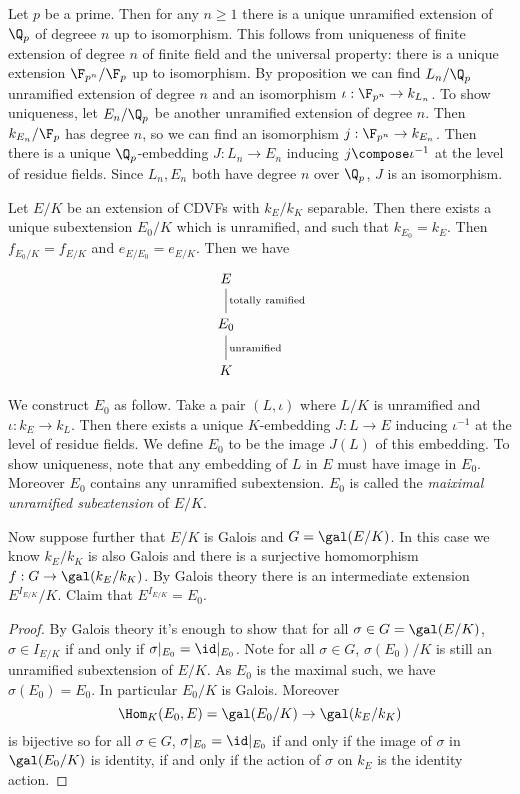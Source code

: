 \documentclass[a4paper]{article}
\begin{document}
\begin{eg}
  Let \(p\) be a prime. Then for any \(n \geq 1\) there is a unique unramified extension of \(\Q_p\) of degreee \(n\) up to isomorphism. This follows from uniqueness of finite extension of degree \(n\) of finite field and the universal property: there is a unique extension \(\F_{p^n}/\F_p\) up to isomorphism. By proposition we can find \(L_n/\Q_p\) unramified extension of degree \(n\) and an isomorphism \(\iota: \F_{p^n} \to k_{L_n}\). To show uniqueness, let \(E_n/\Q_p\) be another unramified extension of degree \(n\). Then \(k_{E_n}/\F_p\) has degree \(n\), so we can find an isomorphism \(j: \F_{p^n} \to k_{E_n}\). Then there is a unique \(\Q_p\)-embedding \(J: L_n \to E_n\) inducing \(j \compose \iota^{-1}\) at the level of residue fields. Since \(L_n, E_n\) both have degree \(n\) over \(\Q_p\), \(J\) is an isomorphism.
\end{eg}

Let \(E/K\) be an extension of CDVFs with \(k_E/k_K\) separable. Then there exists a unique subextension \(E_0/K\) which is unramified, and such that \(k_{E_0} = k_E\). Then \(f_{E_0/K} = f_{E/K}\) and \(e_{E/E_0} = e_{E/K}\). Then we have
\[
  \begin{tikzcd}
    E \ar[d, dash, "\text{totally ramified}"] \\
    E_0 \ar[d, dash, "\text{unramified}"] \\
    K
  \end{tikzcd}
\]

We construct \(E_0\) as follow. Take a pair \((L, \iota)\) where \(L/K\) is unramified and \(\iota: k_E \to k_L\). Then there exists a unique \(K\)-embedding \(J: L \to E\) inducing \(\iota^{-1}\) at the level of residue fields. We define \(E_0\) to be the image \(J(L)\) of this embedding. To show uniqueness, note that any embedding of \(L\) in \(E\) must have image in \(E_0\). Moreover \(E_0\) contains any unramified subextension. \(E_0\) is called the \emph{maiximal unramified subextension} of \(E/K\).

Now suppose further that \(E/K\) is Galois and \(G = \gal(E/K)\). In this case we know \(k_E/k_K\) is also Galois and there is a surjective homomorphism \(f: G \to \gal(k_E/k_K)\). By Galois theory there is an intermediate extension \(E^{I_{E/K}}/K\). Claim that \(E^{I_{E/K}} = E_0\).

\begin{proof}
  By Galois theory it's enough to show that for all \(\sigma \in G = \gal(E/K)\), \(\sigma \in I_{E/K}\) if and only if \(\sigma|_{E_0} = \id|_{E_0}\). Note for all \(\sigma \in G\), \(\sigma(E_0)/K\) is still an unramified subextension of \(E/K\). As \(E_0\) is the maximal such, we have \(\sigma(E_0) = E_0\). In particular \(E_0/K\) is Galois. Moreover
  \[
    \Hom_K(E_0, E) = \gal(E_0/K) \to \gal(k_E/k_K)
  \]
  is bijective so for all \(\sigma \in G\), \(\sigma|_{E_0} = \id|_{E_0}\) if and only if the image of \(\sigma\) in \(\gal(E_0/K)\) is identity, if and only if the action of \(\sigma\) on \(k_E\) is the identity action.
\end{proof}
\end{document}
